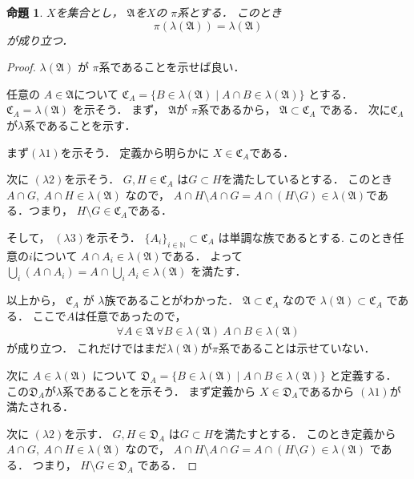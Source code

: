 \documentclass[leqno, a4paper, 12pt]{jsarticle}
\newtheorem{prop}[thm]{命題}
\newcommand{\nn}{\mathbb{N}}
\begin{document}
\begin{prop}\label{prop:pl=l}
$X$を集合とし，
$\mathfrak{A}$を$X$の
$\pi$系とする．
このとき
\[
\pi(\lambda(\mathfrak{A}))=\lambda(\mathfrak{A})
\]
が成り立つ．
\end{prop}
\begin{proof}
$\lambda(\mathfrak{A})$
が
$\pi$系であることを示せば良い．

任意の
$A\in \mathfrak{A}$について
 $\mathfrak{C}_A
 =\{B\in \lambda(\mathfrak{A})\mid A\cap B\in \lambda(\mathfrak{A})\}$
 とする．
 $\mathfrak{C}_{A}=\lambda(\mathfrak{A})$
 を示そう．
 まず，
 $\mathfrak{A}$が
 $\pi$系であるから，
 $\mathfrak{A}\subset \mathfrak{C}_{A}$
 である．
 次に$\mathfrak{C}_{A}$
 が$\lambda$系であることを示す．

 まず$(\lambda1)$を示そう．
 定義から明らかに
 $X\in \mathfrak{C}_A$である．
 
 次に
 $(\lambda 2)$を示そう．
 $G, H\in \mathfrak{C}_A$
 は$G\subset H$を満たしているとする．
 このとき 
 $A\cap G, \ A\cap H\in \lambda(\mathfrak{A})$
 なので，
 $A\cap H\setminus A\cap G=
 A\cap (H\setminus G)\in \lambda(\mathfrak{A})$である．つまり，
 $H\setminus G\in \mathfrak{C}_{A}$である．

 そして，
 $(\lambda 3)$を示そう．
 $\{A_{i}\}_{i\in \nn}\subset \mathfrak{C}_{A}$
 は単調な族であるとする.
 このとき任意の$i$について 
 $A\cap A_{i}\in \lambda(\mathfrak{A})$である．
 よって
 $\bigcup_{i}(A\cap A_{i})=
 A\cap \bigcup_{i}A_{i}\in \lambda(\mathfrak{A})$
 を満たす．
 
 以上から，
 $\mathfrak{C}_A$
 が
 $\lambda$族であることがわかった．
 $\mathfrak{A}\subset \mathfrak{C}_{A}$
 なので
 $\lambda(\mathfrak{A})\subset \mathfrak{C}_A$
 である．
ここで$A$は任意であったので，
\begin{align}
	\forall A\in \mathfrak{A}\ 
	\forall B\in \lambda(\mathfrak{A})\ 
	A\cap B\in \lambda(\mathfrak{A})
\end{align}
が成り立つ．
これだけではまだ$\lambda(\mathfrak{A})$が$\pi$系であることは示せていない．

次に
$A\in \lambda(\mathfrak{A})$
について
$\mathfrak{D}_{A}=\{B\in \lambda(\mathfrak{A})\mid A\cap B\in \lambda(\mathfrak{A})\}$
と定義する．
この$\mathfrak{D}_{A}$が$\lambda$系であることを示そう．
まず定義から
$X\in \mathfrak{D}_{A}$であるから
$(\lambda 1)$が満たされる．

次に
$(\lambda 2)$を示す．
$G, H\in \mathfrak{D}_{A}$
は$G\subset H$を満たすとする．
このとき定義から
$A\cap G, \ A\cap H\in \lambda(\mathfrak{A})$
 なので，
 $A\cap H\setminus A\cap G=
 A\cap (H\setminus G)\in \lambda(\mathfrak{A})$
 である．
 つまり，
 $H\setminus G\in \mathfrak{D}_{A}$
である．



\end{proof}
\end{document}
